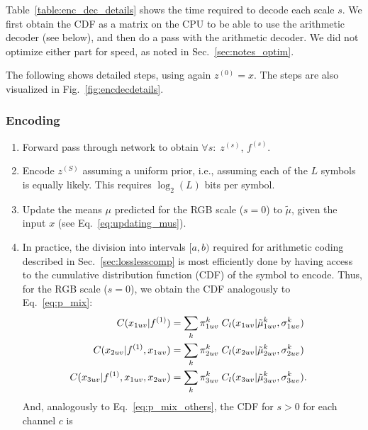 \documentclass[10pt,twocolumn,letterpaper]{article}
\begin{document}
Table~\ref{table:enc_dec_details} shows the time required to decode each scale $s$. We first obtain the CDF as a matrix on the CPU to be able to use the arithmetic decoder (see below), and then do a pass with the arithmetic decoder. We did not optimize either part for speed, as noted in Sec.~\ref{sec:notes_optim}. 



The following shows detailed steps, using again $z^{(0)} = x$. The steps are also visualized in Fig.~\ref{fig:encdecdetails}.

\subsubsection*{Encoding}
\begin{enumerate}[leftmargin=*]
    \item Forward pass through network to obtain $\forall s: \; z^{(s)}$, $f^{(s)}$.
    \item Encode $z^{(S)}$ assuming a uniform prior, i.e., assuming each of the $L$ symbols is equally likely. This requires $\log_2(L)$ bits per symbol.
    \item Update the means $\mu$ predicted for the RGB scale ($s=0$) to $\tilde \mu$, given the input $x$ (see Eq.~\eqref{eq:updating_mus}).
    \item In practice, the division into intervals $[a,b)$ required for arithmetic coding described in Sec.~\ref{sec:losslesscomp} is most efficiently done by having access to the cumulative distribution function (CDF) of the symbol to encode. 
        Thus, for the RGB scale ($s=0$), we obtain the CDF analogously to Eq.~\eqref{eq:p_mix}:
        \begin{align}
            \hspace{-2ex}C(x_{1uv} | f^{(1)}) &= \sum_k \pi^k_{1uv} \; C_l(x_{1uv} | \tilde \mu^k_{1uv}, \sigma^k_{1uv}) \nonumber \\
            \hspace{-2ex}C(x_{2uv} | f^{(1)}, x_{1uv}) &= \sum_k \pi^k_{2uv} \; C_l(x_{2uv} | \tilde \mu^k_{2uv}, \sigma^k_{2uv}) \nonumber \\
            \hspace{-2ex}C(x_{3uv} | f^{(1)}, x_{1uv}, x_{2uv}) &= \sum_k \pi^k_{3uv} \; C_l(x_{3uv} | \tilde \mu^k_{3uv}, \sigma^k_{3uv}). \label{eq:C_mix}
\end{align}
        And, analogously to Eq.~\eqref{eq:p_mix_others}, the CDF for $s>0$ for each channel $c$ is
        \begin{equation}

\end{equation}
\end{enumerate}
\end{document}
